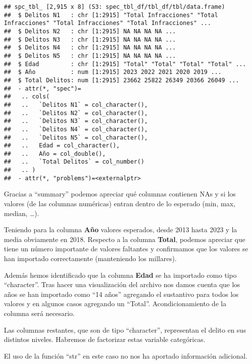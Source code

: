 \documentclass[,,,,pdftex]{Definitions/mdpi}
\newenvironment{Shaded}{\begin{snugshade}}{\end{snugshade}}
\newcommand{\CommentTok}[1]{\textcolor[rgb]{0.56,0.35,0.01}{\textit{#1}}}
\newcommand{\FunctionTok}[1]{\textcolor[rgb]{0.13,0.29,0.53}{\textbf{#1}}}
\newcommand{\NormalTok}[1]{#1}
\newcommand{\SpecialCharTok}[1]{\textcolor[rgb]{0.81,0.36,0.00}{\textbf{#1}}}
\newcommand{\StringTok}[1]{\textcolor[rgb]{0.31,0.60,0.02}{#1}}
\begin{document}
\begin{verbatim}
## spc_tbl_ [2,915 x 8] (S3: spec_tbl_df/tbl_df/tbl/data.frame)
##  $ Delitos N1   : chr [1:2915] "Total Infracciones" "Total Infracciones" "Total Infracciones" "Total Infracciones" ...
##  $ Delitos N2   : chr [1:2915] NA NA NA NA ...
##  $ Delitos N3   : chr [1:2915] NA NA NA NA ...
##  $ Delitos N4   : chr [1:2915] NA NA NA NA ...
##  $ Delitos N5   : chr [1:2915] NA NA NA NA ...
##  $ Edad         : chr [1:2915] "Total" "Total" "Total" "Total" ...
##  $ Año          : num [1:2915] 2023 2022 2021 2020 2019 ...
##  $ Total Delitos: num [1:2915] 23662 25822 26349 20366 26049 ...
##  - attr(*, "spec")=
##   .. cols(
##   ..   `Delitos N1` = col_character(),
##   ..   `Delitos N2` = col_character(),
##   ..   `Delitos N3` = col_character(),
##   ..   `Delitos N4` = col_character(),
##   ..   `Delitos N5` = col_character(),
##   ..   Edad = col_character(),
##   ..   Año = col_double(),
##   ..   `Total Delitos` = col_number()
##   .. )
##  - attr(*, "problems")=<externalptr>
\end{verbatim}

Gracias a ``summary'' podemos apreciar qué columnas contienen NAs y si
los valores (de las columnas numéricas) entran dentro de lo esperado
(min, max, median, \ldots).

Teniendo para la columna \textbf{Año} valores esperados, desde 2013
hasta 2023 y la media obviamente en 2018. Respecto a la columna
\textbf{Total}, podemos apreciar que tiene un número importante de
valores faltantes y confirmamos que los valores se han importado
correctamente (manteniendo los millares).

Además hemos identificado que la columna \textbf{Edad} se ha importado
como tipo ``character''. Tras hacer una visualización del archivo nos
damos cuenta que los años se han importado como ``14 años'' agregando el
sustantivo para todos los valores y en algunos casos agregando un
``Total''. Acondicionamiento de la columna será necesario.

Las columnas restantes, que son de tipo ``character'', representan el
delito en sus distintos niveles. Habremos de factorizar estas variable
categóricas.

El uso de la función ``str'' en este caso no nos ha aportado información
adicional.

\begin{Shaded}
\end{Shaded}
\end{document}
